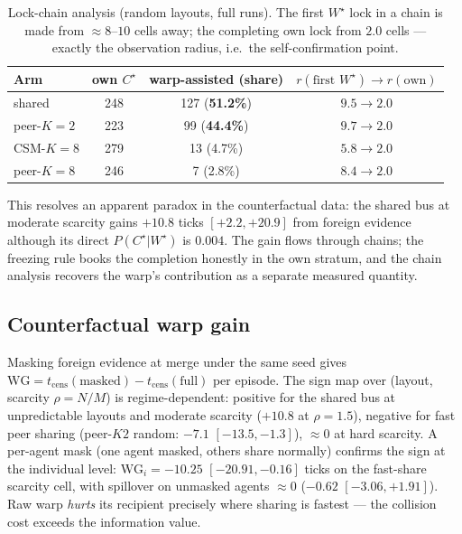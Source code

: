 \documentclass{article}
\newcommand{\wstar}{W^{\star}}
\newcommand{\cstar}{C^{\star}}
\begin{document}
\begin{table}[h]
\centering
\caption{Lock-chain analysis (random layouts, full runs). The first
$\wstar$ lock in a chain is made from ${\approx}8$--$10$ cells away;
the completing own lock from $2.0$ cells --- exactly the observation
radius, i.e.\ the self-confirmation point.}
\label{tab:taxi}
\small
\begin{tabular}{lccc}
\toprule
Arm & own $\cstar$ & warp-assisted (share) & $r(\text{first }\wstar) \to r(\text{own})$ \\
\midrule
shared          & 248 & 127 (\textbf{51.2\%}) & $9.5 \to 2.0$ \\
peer-$K{=}2$    & 223 & 99 (\textbf{44.4\%})  & $9.7 \to 2.0$ \\
CSM-$K{=}8$     & 279 & 13 (4.7\%)            & $5.8 \to 2.0$ \\
peer-$K{=}8$    & 246 & 7 (2.8\%)             & $8.4 \to 2.0$ \\
\bottomrule
\end{tabular}
\end{table}

This resolves an apparent paradox in the counterfactual data: the
shared bus at moderate scarcity gains $+10.8$ ticks $[+2.2,+20.9]$
from foreign evidence although its direct $P(\cstar|\wstar)$ is
$0.004$. The gain flows through chains; the freezing rule books the
completion honestly in the own stratum, and the chain analysis
recovers the warp's contribution as a separate measured quantity.

\subsection{Counterfactual warp gain}
\label{sec:gain}

Masking foreign evidence at merge under the same seed gives
$\mathrm{WG} = t_{\text{cens}}(\text{masked}) -
t_{\text{cens}}(\text{full})$ per episode. The sign map over (layout,
scarcity $\rho{=}N/M$) is regime-dependent: positive for the shared
bus at unpredictable layouts and moderate scarcity ($+10.8$ at
$\rho{=}1.5$), negative for fast peer sharing (peer-$K2$ random:
$-7.1$ $[-13.5,-1.3]$), ${\approx}0$ at hard scarcity. A per-agent
mask (one agent masked, others share normally) confirms the sign at
the individual level: $\mathrm{WG}_i = -10.25$ $[-20.91,-0.16]$ ticks
on the fast-share scarcity cell, with spillover on unmasked agents
${\approx}0$ ($-0.62$ $[-3.06,+1.91]$). Raw warp \emph{hurts} its
recipient precisely where sharing is fastest --- the collision cost
exceeds the information value. %
\end{document}
